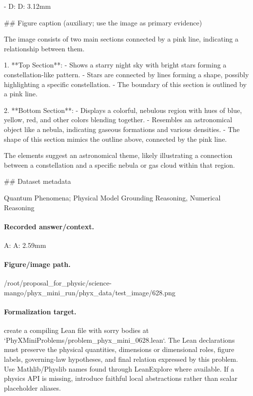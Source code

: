 - D: D: 3.12mm

\#\# Figure caption (auxiliary; use the image as primary evidence)

The image consists of two main sections connected by a pink line, indicating a relationship between them. 

1. **Top Section**: 
   - Shows a starry night sky with bright stars forming a constellation-like pattern.
   - Stars are connected by lines forming a shape, possibly highlighting a specific constellation.
   - The boundary of this section is outlined by a pink line.

2. **Bottom Section**:
   - Displays a colorful, nebulous region with hues of blue, yellow, red, and other colors blending together.
   - Resembles an astronomical object like a nebula, indicating gaseous formations and various densities.
   - The shape of this section mimics the outline above, connected by the pink line.

The elements suggest an astronomical theme, likely illustrating a connection between a constellation and a specific nebula or gas cloud within that region.

\#\# Dataset metadata

Quantum Phenomena; Physical Model Grounding Reasoning, Numerical Reasoning

\paragraph{Recorded answer/context.}
A: A: 2.59mm

\paragraph{Figure/image path.}
/root/proposal\_for\_physic/science-mango/phyx\_mini\_run/phyx\_data/test\_image/628.png

\paragraph{Formalization target.}
create a compiling Lean file with sorry bodies at `PhyXMiniProblems/problem\_phyx\_mini\_0628.lean`. The Lean declarations must preserve the physical quantities, dimensions or dimensional roles, figure labels, governing-law hypotheses, and final relation expressed by this problem.
Use Mathlib/Physlib names found through LeanExplore where available. If a physics API is missing, introduce faithful local abstractions rather than scalar placeholder aliases.

